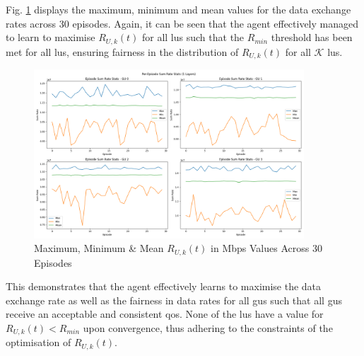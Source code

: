 Fig. \ref{fig:episodes_sum_rates_all_gus} displays the maximum, minimum and mean values for the data exchange rates across 30 episodes. 
Again, it can be seen that the agent effectively managed to learn to maximise $R_{U, k} (t)$ for all \acrshort{lu}s such that the $R_{min}$ threshold has been met for all \acrshort{lu}s, ensuring fairness in the distribution of $R_{U, k} (t)$ for all $\mathcal{K}$ \acrshort{lu}s. 
\begin{figure} [ht!]
    \centering
    \includegraphics[width=0.9\textwidth]{figures/test9/1_episode_sum_rate_stats.png}
    \caption{Maximum, Minimum \& Mean $R_{U, k} (t)$ in Mbps Values Across 30 Episodes}
    \label{fig:episodes_sum_rates_all_gus}
\end{figure}

This demonstrates that the agent effectively learns to maximise the data exchange rate as well as the fairness in data rates for all \acrshort{gu}s such that all \acrshort{gu}s receive an acceptable and consistent \acrshort{qos}. 
None of the \acrshort{lu}s have a value for $R_{U, k} (t) < R_{min}$ upon convergence, thus adhering to the constraints of the optimisation of $R_{U, k} (t)$. 

%

